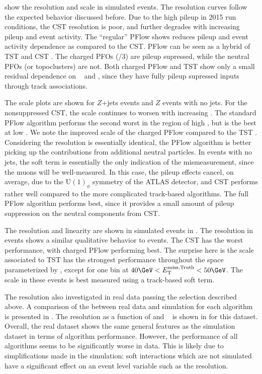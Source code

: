  show the resolution and scale in simulated \Zmm events.
The resolution curves follow the expected behavior discussed before.
Due to the high pileup in 2015 run conditions, the CST \met resolution is poor, and further degrades with increasing pileup and event activity.
The ``regular'' PFlow \met shows reduces pileup and event activity dependence as compared to the CST.
PFlow \met can be seen as a hybrid of TST \met and CST \met.
The charged PFOs (/3) are pileup supressed, while the neutral PFOs (or topoclusters) are not.
Both charged PFlow and TST \met show only a small residual dependence on \npv~ and \sumET, since they have fully pileup supressed inputs through track associations.

The scale plots are shown for $Z$+jets events and $Z$ events with no jets.
For the nonsuppressed CST, the scale continues to worsen with increasing \ptZ.
The standard PFlow algorithm performs the second worst in the region of high \ptZ, but is the best at low \ptZ.
We note the improved scale of the charged PFlow \met compared to the TST \met.
Considering the resolution is essentially identical, the PFlow algorithm is better picking up the contributions from additional neutral particles.
In events with no jets, the soft term is essentially the only indication of the \met mismeasurement, since the muons will be well-measured.
In this case, the pileup effects cancel, on average, due to the U$(1)_\phi$ symmetry of the ATLAS detector, and CST performs rather well compared to the more complicated track-based algorithms.
The full PFlow algorithm performs best, since it provides a small amount of pileup suppression on the neutral components from CST.

The resolution and linearity are shown in simulated \Wen events in .
The resolution in \Wen events shows a similar qualitative behavior to \Zmm events.
The CST \met has the worst performance, with charged PFlow \met performing best.
The surprise here is the scale associated to TST \met has the strongest performance throughout the space parameterized by \mettrue, except for one bin at $40 \GeV < \mettrue < 50 \GeV$.
The scale in these events is best measured using a track-based soft term.

The resolution also investigated in real data passing the \Zmm selection described above.
A comparison of the \met between real data and simulation for each algorithm is presented in .
The resolution as a function of \sumET and \npv~ is shown in  for this dataset.
Overall, the real dataset shows the same general features as the simulation dataset in terms of algorithm performance.
However, the performance of all algorithms seems to be significantly worse in data.
This is likely due to simplifications made in the simulation: soft interactions which are not simulated have a significant effect on an event level variable such as the \met resolution.

